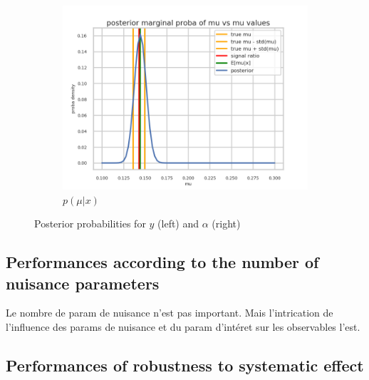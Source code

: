 \begin{figure}[htb]
  \begin{subfigure}[t]{0.49\linewidth}
    \includegraphics[width=\linewidth]{s3d2/marginal_mu.png}
    \caption{$p(\mu|x)$}
    \label{fig:marginal_mu}
  \end{subfigure}
  \caption{Posterior probabilities for $y$ (left) and $\alpha$ (right)}
  \label{fig:marginals}
\end{figure}









\subsection{Performances according to the number of nuisance parameters} %
\label{sub:performances_according_to_the_number_of_nuisance_parameters}


Le nombre de param de nuisance n'est pas important. 
Mais l'intrication de l'influence des params de nuisance et du param d'intéret sur les observables l'est.









\subsection{Performances of robustness to systematic effect} %
\label{sub:performances_of_robustness_to_systematic_effect}


